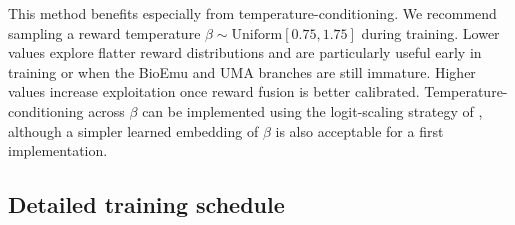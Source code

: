 \documentclass[11pt]{article}
\begin{document}
	This method benefits especially from temperature-conditioning. We recommend sampling a reward temperature $\beta\sim\mathrm{Uniform}[0.75,1.75]$ during training. Lower values explore flatter reward distributions and are particularly useful early in training or when the BioEmu and UMA branches are still immature. Higher values increase exploitation once reward fusion is better calibrated. Temperature-conditioning across $\beta$ can be implemented using the logit-scaling strategy of \citet{kim2023lsl-gfn}, although a simpler learned embedding of $\beta$ is also acceptable for a first implementation.
	
	
	\subsection{Detailed training schedule}
	
\end{document}
